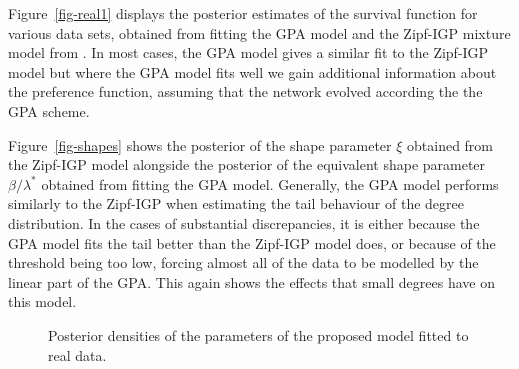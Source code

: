 \documentclass[
  sn-basic,
]{sn-jnl}
\theoremstyle{plain}
\theoremstyle{plain}
\theoremstyle{remark}
\begin{document}
Figure~\ref{fig-real1} displays the posterior estimates of the survival
function for various data sets, obtained from fitting the GPA model and
the Zipf-IGP mixture model from \citet{Lee24}. In most cases, the GPA
model gives a similar fit to the Zipf-IGP model but where the GPA model
fits well we gain additional information about the preference function,
assuming that the network evolved according the the GPA scheme.

Figure~\ref{fig-shapes} shows the posterior of the shape parameter
\(\xi\) obtained from the Zipf-IGP model alongside the posterior of the
equivalent shape parameter \(\beta/\lambda^*\) obtained from fitting the
GPA model. Generally, the GPA model performs similarly to the Zipf-IGP
when estimating the tail behaviour of the degree distribution. In the
cases of substantial discrepancies, it is either because the GPA model
fits the tail better than the Zipf-IGP model does, or because of the
threshold being too low, forcing almost all of the data to be modelled
by the linear part of the GPA. This again shows the effects that small
degrees have on this model.

\begin{figure}


\caption{\label{fig-parplot}Posterior densities of the parameters of the
proposed model fitted to real data.}

\end{figure}%
\end{document}
